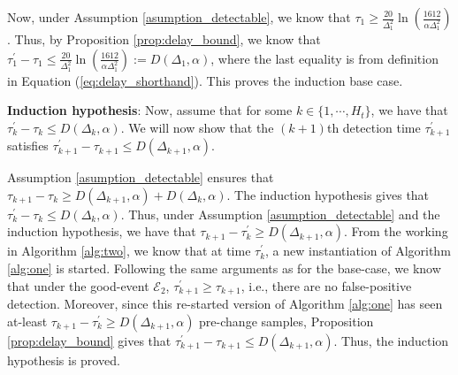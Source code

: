 Now, under Assumption \ref{asumption_detectable}, we know that $\tau_1 \geq \frac{20}{\Delta_1^2}\ln \left( \frac{1612}{\alpha \Delta_1^2}\right)$. Thus, by Proposition \ref{prop:delay_bound}, we know that $\tau_1^{'} - \tau_1 \leq \frac{20}{\Delta_1^2}\ln \left( \frac{1612}{\alpha \Delta_1^2}\right) := D(\Delta_1, \alpha)$, where the last equality is from  definition in Equation (\ref{eq:delay_shorthand}). This proves the induction base case. 

\textbf{Induction hypothesis}: Now, assume that for some $k \in \{1,\cdots, H_t\}$, we have that $\tau_{k}^{'} - \tau_k \leq D(\Delta_k, \alpha)$. We will now show that the $(k+1)$th detection time $\tau_{k+1}^{'}$ satisfies $\tau_{k+1}^{'} - \tau_{k+1} \leq D(\Delta_{k+1}, \alpha)$.

Assumption \ref{asumption_detectable} ensures that $\tau_{k+1} - \tau_{k} \geq D(\Delta_{k+1}, \alpha) + D(\Delta_k, \alpha)$. The induction hypothesis gives that  $\tau_{k}^{'} - \tau_k \leq D(\Delta_k, \alpha)$. Thus, under Assumption \ref{asumption_detectable} and the induction hypothesis,  we have that $\tau_{k+1} - \tau_k^{'} \geq D(\Delta_{k+1}, \alpha)$. From the working in Algorithm \ref{alg:two}, we know that at time $\tau_k^{'}$, a new instantiation of Algorithm \ref{alg:one} is started. Following the same arguments as for the base-case, we know that under the good-event $\mathcal{E}_2$, $\tau_{k+1}^{'} \geq \tau_{k+1}$, i.e., there are no false-positive detection. Moreover, since this re-started version of Algorithm \ref{alg:one} has seen at-least $\tau_{k+1} - \tau_k^{'} \geq D(\Delta_{k+1}, \alpha)$ pre-change samples, Proposition \ref{prop:delay_bound} gives that $\tau_{k+1}^{'} - \tau_{k+1} \leq D(\Delta_{k+1}, \alpha)$. Thus, the induction hypothesis is proved. 



